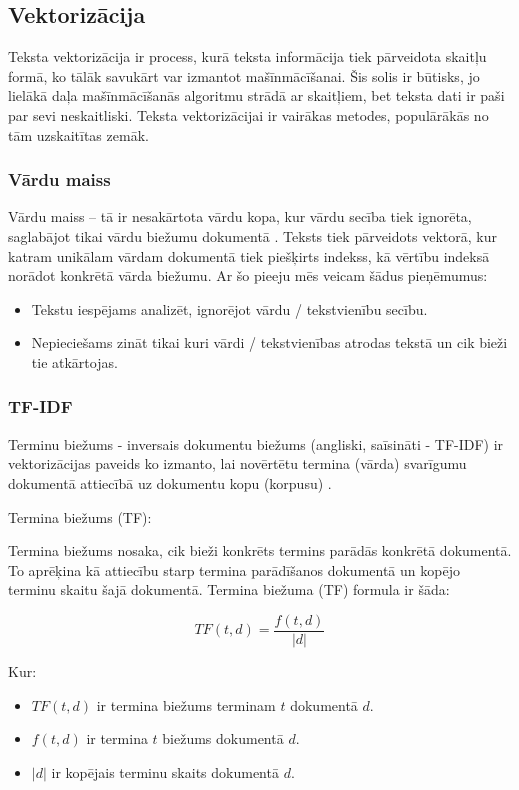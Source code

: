 \subsection{Vektorizācija}
Teksta vektorizācija ir process, kurā teksta informācija tiek pārveidota skaitļu formā, ko tālāk savukārt var izmantot mašīnmācīšanai. Šis solis ir būtisks, jo lielākā daļa mašīnmācīšanās algoritmu strādā ar skaitļiem, bet teksta dati ir paši par sevi neskaitliski. Teksta vektorizācijai ir vairākas metodes, populārākās no tām uzskaitītas zemāk.

\subsubsection{Vārdu maiss}
Vārdu maiss – tā ir nesakārtota vārdu kopa, kur vārdu secība tiek ignorēta, saglabājot tikai vārdu biežumu dokumentā \cite{speechandlanguageproc}. Teksts tiek pārveidots vektorā, kur katram unikālam vārdam dokumentā tiek piešķirts indekss, kā vērtību indeksā norādot konkrētā vārda biežumu. Ar šo pieeju mēs veicam šādus pieņēmumus:
\begin{itemize}
\item Tekstu iespējams analizēt, ignorējot vārdu / tekstvienību secību.
\item Nepieciešams zināt tikai kuri vārdi / tekstvienības atrodas tekstā un cik bieži tie atkārtojas.
\end{itemize}

\subsubsection{TF-IDF}
Terminu biežums - inversais dokumentu biežums (angliski, saīsināti - TF-IDF) ir vektorizācijas paveids ko izmanto, lai novērtētu termina (vārda) svarīgumu dokumentā attiecībā uz dokumentu kopu (korpusu) \cite{manning_raghavan_schutze_2008}. 

Termina biežums (TF):

Termina biežums nosaka, cik bieži konkrēts termins parādās konkrētā dokumentā. To aprēķina kā attiecību starp termina parādīšanos dokumentā un kopējo terminu skaitu šajā dokumentā. Termina biežuma (TF) formula ir šāda:

\begin{equation}
TF(t, d) = \frac{f(t, d)}{|d|}
\end{equation}

\noindent Kur:
\begin{itemize}
\item \(TF(t, d)\) ir termina biežums terminam \(t\) dokumentā \(d\).
\item \(f(t, d)\) ir termina \(t\) biežums dokumentā \(d\).
\item \(|d|\) ir kopējais terminu skaits dokumentā \(d\).
\end{itemize}

